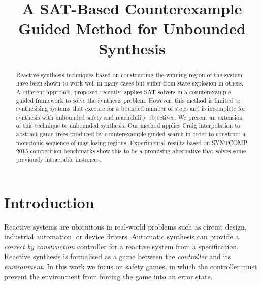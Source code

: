 \documentclass{llncs}
\begin{document}
\title{A SAT-Based Counterexample Guided Method for Unbounded Synthesis}

\author{}
\institute{}

%

\maketitle

\sloppy

\begin{abstract}

    Reactive synthesis techniques based on constructing the winning region of
    the system have been shown to work well in many cases but suffer from state
    explosion in others.  A different approach, proposed recently, applies SAT
    solvers in a counterexample guided framework to solve the synthesis
    problem.  However, this method is limited to synthesising systems that
    execute for a bounded number of steps and is incomplete for synthesis with
    unbounded safety and reachability objectives.  We present an extension of
    this technique to unbounded synthesis.  Our method applies Craig
    interpolation to abstract game trees produced by counterexample guided
    search in order to construct a monotonic sequence of may-losing regions.
    Experimental results based on SYNTCOMP 2015 competition benchmarks show
    this to be a promising alternative that solves some previously intractable
    instances.

\end{abstract}

\section{Introduction}

Reactive systems are ubiquitous in real-world problems such as circuit design,
industrial automation, or device drivers. Automatic synthesis can provide a
\emph{correct by construction} controller for a reactive system from a
specification.  Reactive synthesis is formalised as a game between the \emph{controller} and
its \emph{environment}. In this work we focus on safety games, in which the
controller must prevent the environment from forcing the game into an error
state.
\end{document}
